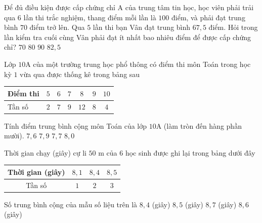 \begin{ex}%
	Để đủ điều kiện được cấp chứng chỉ A của trung tâm tin học, học viên phải trải qua $6$ lần thi  trắc nghiệm, thang điểm mỗi lần là $100$ điểm, và phải đạt trung bình $70$ điểm trở lên. Qua $5$ lần thi bạn Vân đạt trung bình $67{,}5$ điểm. Hỏi trong lần kiểm tra cuối cùng Vân phải đạt ít nhất bao nhiêu điểm để được cấp chứng chỉ?
	 \choice
		{$70$} 
		{$80$} 
		{$90$} 
		{\True  $82{,}5$}
\end{ex}

\begin{ex}%
	Lớp $10$A của một trường trung học phổ thông có điểm thi môn Toán trong học kỳ $1$ vừa qua được thống  kê trong bảng sau
	\begin{center}
		\begin{tabular}{|l|c|c|c|c|c|c|}
			\hline Điểm thi & $5$ & $6$ & $7$ & $8$  & $9$ & $10$ \\
			\hline Tần số & $2$ & $7$ & $9$  & $12$ & $8$ & $4$ \\
			\hline 
		\end{tabular}
	\end{center}
	Tính điểm trung bình cộng môn Toán của lớp $10$A (làm  tròn đến hàng phần mười).
	\choice 
		 {$7{,}6$}
		 {$7{,}9$}
		{\True $7{,}7$} 
		{$8{,}0$} 
\end{ex}

\begin{ex}%
	Thời gian chạy (giây) cự li  $50$ m của $6$ học sinh được ghi lại trong bảng dưới đây
	\begin{center}
		\begin{tabular}{|c|c|c|c|}
			\hline Thời gian (giây) & $8{,}1$ &  $8{,}4$ & $8{,}5$ \\
			\hline  Tần số & $1$ & $2$ & $3$ \\
			 \hline
		\end{tabular}
	\end{center}
	Số trung bình cộng của mẫu số liệu trên  là
	\choice 
		{\True  $8{,}4$ (giây)}
		{$8{,}5$ (giây)} 
		 {$8{,}7$ (giây)}
		{$8{,}6$ (giây)} 
\end{ex}

